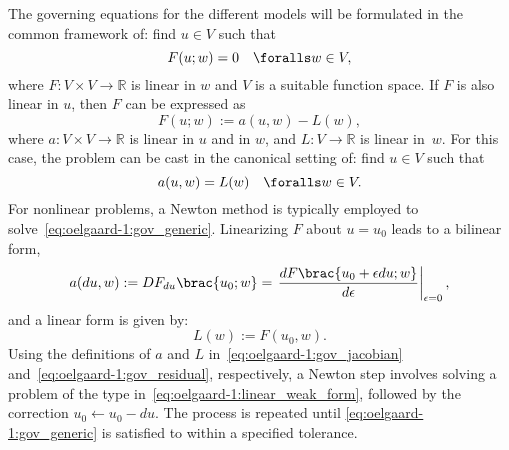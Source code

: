 The governing equations for the different models will be formulated in
the common framework of: find $u \in V$ such that
%
\begin{equation}
  F(u; w) = 0 \quad \foralls w \in V,
  \label{eq:oelgaard-1:gov_generic}
\end{equation}
%
where $F: V \times V \rightarrow \mathbb{R}$ is linear in $w$ and $V$
is a suitable function space. If $F$ is also linear in $u$, then $F$
can be expressed as
%
\begin{equation}
  F(u; w) := a(u, w) - L(w),
\end{equation}
%
where $a: V \times V \rightarrow \mathbb{R}$ is linear in $u$ and in $w$,
and $L: V \rightarrow \mathbb{R}$ is linear in~$w$.  For this case, the
problem can be cast in the canonical setting of: find $u \in V$ such that
%
\begin{equation}
  a(u, w) = L(w) \quad \foralls w \in V.
\label{eq:oelgaard-1:linear_weak_form}
\end{equation}
%
For nonlinear problems, a Newton method is typically employed to
solve~\eqref{eq:oelgaard-1:gov_generic}.  Linearizing $F$ about $u =
u_{0}$ leads to a bilinear form,
%
\begin{equation}
  a(du, w) := D F_{du}\brac{u_{0}; w}
     = \left. \frac{d F\brac{u_{0} + \epsilon du; w}}{d \epsilon} \right|_{\epsilon = 0},
\label{eq:oelgaard-1:gov_jacobian}
\end{equation}
%
and a linear form is given by:
%
\begin{equation}
  L(w) := F(u_{0}, w).
\label{eq:oelgaard-1:gov_residual}
\end{equation}
%
Using the definitions of $a$ and $L$ in~\eqref{eq:oelgaard-1:gov_jacobian}
and~\eqref{eq:oelgaard-1:gov_residual}, respectively,
a Newton step involves solving a problem of the type
in~\eqref{eq:oelgaard-1:linear_weak_form}, followed by the correction
$u_{0} \leftarrow u_{0} - du$. The process is repeated until
\eqref{eq:oelgaard-1:gov_generic} is satisfied to within a specified
tolerance.

